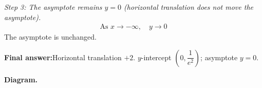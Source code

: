 \documentclass[11pt]{article}
\begin{document}
\textit{Step 3: The asymptote remains \( y = 0 \) (horizontal translation does not move the asymptote).}
\[\begin{gathered}
\text{As } x \to -\infty, \quad y \to 0
\end{gathered}\]
The asymptote is unchanged.

\begin{answerbox}
\textbf{Final answer:}\quad Horizontal translation \(\displaystyle  +2 \). \(\displaystyle  y \)-intercept \(\displaystyle  \left(0, \dfrac{1}{e^2}\right) \); asymptote \(\displaystyle  y = 0 \).
\end{answerbox}
\textbf{Diagram.}

\begin{center}
\end{center}
\end{document}
